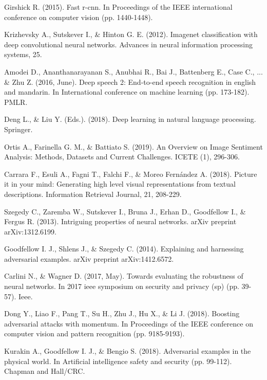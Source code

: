 \begin{thebibliography}{}

Girshick R. (2015). Fast r-cnn. In Proceedings of the IEEE international conference on computer vision (pp. 1440-1448).

Krizhevsky A., Sutskever I., \& Hinton G. E. (2012). Imagenet classification with deep convolutional neural networks. Advances in neural information processing systems, 25.

Amodei D., Ananthanarayanan S., Anubhai R., Bai J., Battenberg E., Case C., ... \& Zhu Z. (2016, June). Deep speech 2: End-to-end speech recognition in english and mandarin. In International conference on machine learning (pp. 173-182). PMLR.

Deng L., \& Liu Y. (Eds.). (2018). Deep learning in natural language processing. Springer.

Ortis A., Farinella G. M., \& Battiato S. (2019). An Overview on Image Sentiment Analysis: Methods, Datasets and Current Challenges. ICETE (1), 296-306.

Carrara F., Esuli A., Fagni T., Falchi F., \& Moreo Fernández A. (2018). Picture it in your mind: Generating high level visual representations from textual descriptions. Information Retrieval Journal, 21, 208-229.

Szegedy C., Zaremba W., Sutskever I., Bruna J., Erhan D., Goodfellow I., \& Fergus R. (2013). Intriguing properties of neural networks. arXiv preprint arXiv:1312.6199.

Goodfellow I. J., Shlens J., \& Szegedy C. (2014). Explaining and harnessing adversarial examples. arXiv preprint arXiv:1412.6572.

Carlini N., \& Wagner D. (2017, May). Towards evaluating the robustness of neural networks. In 2017 ieee symposium on security and privacy (sp) (pp. 39-57). Ieee.

Dong Y., Liao F., Pang T., Su H., Zhu J., Hu X., \& Li J. (2018). Boosting adversarial attacks with momentum. In Proceedings of the IEEE conference on computer vision and pattern recognition (pp. 9185-9193).

Kurakin A., Goodfellow I. J., \& Bengio S. (2018). Adversarial examples in the physical world. In Artificial intelligence safety and security (pp. 99-112). Chapman and Hall/CRC.


\end{thebibliography}
